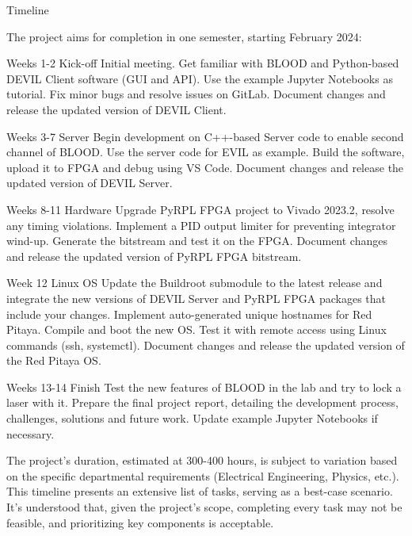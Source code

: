 \documentclass{project-proposal}
\begin{document}
\begin{sectiontimeline}{Timeline}

    The project aims for completion in one semester, starting February 2024:

    \timelineentry
    {Weeks 1-2}
    {Kick-off}
    {
        Initial meeting. Get familiar with BLOOD and Python-based DEVIL Client software
        (GUI and API). Use the example Jupyter Notebooks as tutorial. Fix minor bugs
        and resolve issues on GitLab. Document changes and release the updated version
        of DEVIL Client.
    }

    \timelineentryspacer

    \timelineentry
    {Weeks 3-7}
    {Server}
    {
        Begin development on C++-based Server code to enable second channel of BLOOD.
        Use the server code for EVIL as example. Build the software, upload it to FPGA
        and debug using VS Code. Document changes and release the updated version of
        DEVIL Server.
    }

    \timelineentryspacer

    \timelineentry
    {Weeks 8-11}
    {Hardware}
    {
        Upgrade PyRPL FPGA project to Vivado 2023.2, resolve any timing violations.
        Implement a PID output limiter for preventing integrator wind-up. Generate the
        bitstream and test it on the FPGA. Document changes and release the updated
        version of PyRPL FPGA bitstream.
    }

    \newpage

    \timelineentry
    {Week 12}
    {Linux OS}
    {
        Update the Buildroot submodule to the latest release and integrate the new
        versions of DEVIL Server and PyRPL FPGA packages that include your changes.
        Implement auto-generated unique hostnames for Red Pitaya. Compile and boot the
        new OS. Test it with remote access using Linux commands (ssh, systemctl).
        Document changes and release the updated version of the Red Pitaya OS.
    }

    \timelineentryspacer

    \timelineentry
    {Weeks 13-14}
    {Finish}
    {
        Test the new features of BLOOD in the lab and try to lock a laser with it.
        Prepare the final project report, detailing the development process, challenges,
        solutions and future work. Update example Jupyter Notebooks if necessary.
    }

    The project's duration, estimated at 300-400 hours, is subject to variation based
    on the specific departmental requirements (Electrical Engineering, Physics, etc.).
    This timeline presents an extensive list of tasks, serving as a best-case scenario.
    It's understood that, given the project's scope, completing every task may not be
    feasible, and prioritizing key components is acceptable.

\end{sectiontimeline}
\end{document}
